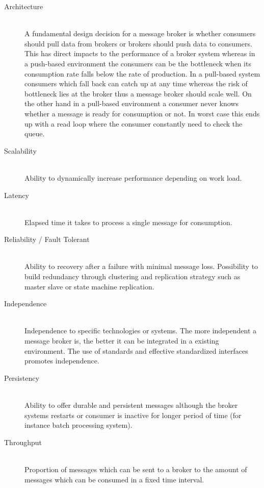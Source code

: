 \begin{description}
    \item [Architecture] \hfill \\
    { A fundamental design decision for a message broker is whether consumers
    should pull data from brokers or brokers should push data to consumers. This
has direct impacts to the performance of a broker system whereas in a push-based
environment the consumers can be the bottleneck when its consumption rate falls
below the rate of production. In a pull-based system consumers which fall back
can catch up at any time whereas the risk of bottleneck lies at the broker thus
 a message broker should scale well. On the other hand in a pull-based
 environment a consumer never knows whether a message is ready for consumption
 or not. In worst case this ends up with a read loop where the consumer
 constantly need to check the queue. }
    \item [Scalability] \hfill \\
    {Ability to dynamically increase performance depending on work load.  }
    \item [Latency]\hfill \\
    {Elapsed time it takes to process a single message for consumption.  }
    \item [Reliability / Fault Tolerant] \hfill \\
        {Ability to recovery after a failure with minimal message loss.
        Possibility to build redundancy through clustering and replication strategy such as
    master slave or state machine replication. }
    \item [Independence] \hfill \\
    { Independence to specific technologies or systems. The more independent a
        message broker is, the better it can be integrated in a existing
        environment. The use of standards and effective standardized interfaces
        promotes independence.}
    \item [Persistency] \hfill \\ 
        {Ability to offer durable and persistent messages although the broker
            systems restarts or consumer is inactive for longer period of time
            (for instance batch processing system). }
    \item [Throughput] \hfill \\
        {Proportion of messages which can be sent to a broker to the amount of
        messages which can be consumed in a fixed time interval.}
\end{description}

